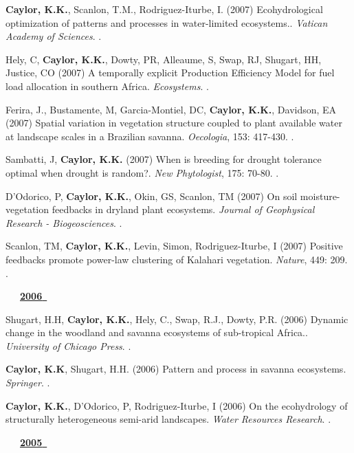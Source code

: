 \begin{etaremune}
\item \textbf{ Caylor, K.K.}, Scanlon, T.M., Rodriguez-Iturbe, I. (2007) Ecohydrological optimization of patterns and processes in water-limited ecosystems.. \emph{Vatican Academy of Sciences}. \doi{-}.
\item Hely, C, \textbf{ Caylor, K.K.}, Dowty, PR, Alleaume, S, Swap, RJ, Shugart, HH, Justice, CO (2007) A temporally explicit Production Efficiency Model for fuel load allocation in southern Africa. \emph{Ecosystems}. .
\item Ferira, J., Bustamente, M, Garcia-Montiel, DC, \textbf{ Caylor, K.K.}, Davidson, EA (2007) Spatial variation in vegetation structure coupled to plant available water at landscape scales in a Brazilian savanna. \emph{Oecologia}, 153: 417-430. .
\item Sambatti, J, \textbf{ Caylor, K.K.} (2007) When is breeding for drought tolerance optimal when drought is random?. \emph{New Phytologist}, 175: 70-80. .
\item D'Odorico, P, \textbf{ Caylor, K.K.}, Okin, GS, Scanlon, TM (2007) On soil moisture-vegetation feedbacks in dryland plant ecosystems. \emph{Journal of Geophysical Research - Biogeosciences}. .
\item Scanlon, TM, \textbf{ Caylor, K.K.}, Levin, Simon, Rodriguez-Iturbe, I (2007) Positive feedbacks promote power-law clustering of Kalahari vegetation. \emph{Nature}, 449: 209. .

\vspace{0.1in}
\mbox{\ \ \ \underline{\textbf{2006 }}}
\vspace{0.1in}

\item Shugart, H.H, \textbf{ Caylor, K.K.}, Hely, C., Swap, R.J., Dowty, P.R. (2006) Dynamic change in the woodland and savanna ecosystems of sub-tropical Africa.. \emph{University of Chicago Press}. \doi{-}.
\item \textbf{ Caylor, K.K}, Shugart, H.H. (2006) Pattern and process in savanna ecosystems. \emph{Springer}. .
\item \textbf{ Caylor, K.K.}, D'Odorico, P, Rodriguez-Iturbe, I (2006) On the ecohydrology of structurally heterogeneous semi-arid landscapes. \emph{Water Resources Research}. .

\vspace{0.1in}
\mbox{\ \ \ \underline{\textbf{2005 }}}
\vspace{0.1in}


\end{etaremune}
